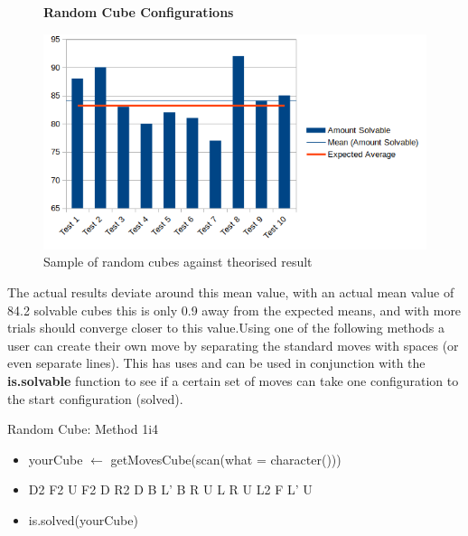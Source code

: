 \documentclass{article}
\newcounter{theo}[section]\setcounter{theo}{0}
\begin{document}
\begin{figure}
\textbf{Random Cube Configurations}\par\medskip
\includegraphics[scale=.8]{randomcube.png}
\caption{Sample of random cubes against theorised result}
\label{fig:randomresult}
\end{figure}The actual results deviate around this mean value, with an actual mean value of 84.2 solvable cubes this is only 0.9 away from the expected means, and with more trials should converge closer to this value.\newline Using one of the following methods a user can create their own move by separating the standard moves with spaces (or even separate lines). This has uses and can be used in conjunction with the \textbf{is.solvable} function to see if a certain set of moves can take one configuration to the start configuration (solved).
%




\begin{myinput}{Random Cube: Method 1}{i4}
\begin{itemize}
\item yourCube $\leftarrow$ getMovesCube(scan(what = character()))
\item  D2 F2 U F2 D R2 D B L' B R U L R U L2 F L' U
\item is.solved(yourCube)
\end{itemize}
\end{myinput}
\end{document}

